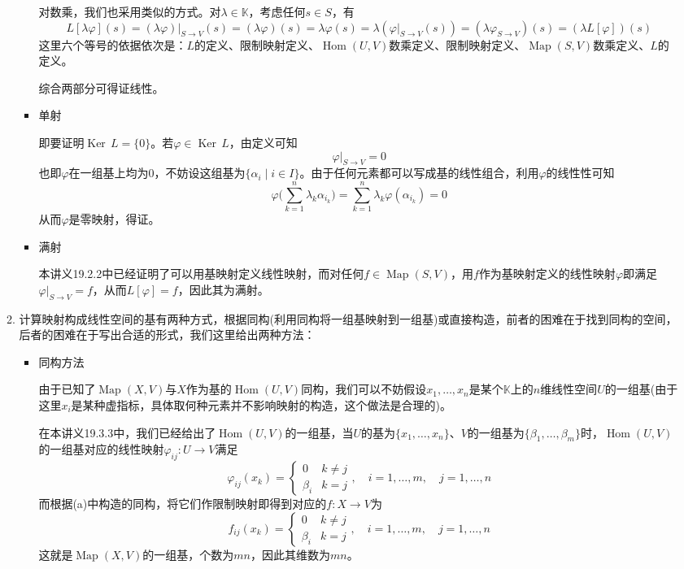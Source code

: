 \documentclass[a4paper,UTF8,fontset=windows,AutoFakeBold]{ctexart}
\DeclareMathOperator{\Ker}{Ker\,}
\DeclareMathOperator{\Hom}{Hom}
\DeclareMathOperator{\Map}{Map}
\begin{document}
\begin{enumerate}
\begin{enumerate}
\begin{itemize}
            对数乘，我们也采用类似的方式。对$\lambda\in\mathbb{K}$，考虑任何$s\in S$，有
            $$L[\lambda\varphi](s)=(\lambda\varphi)|_{S\to V}(s)=(\lambda\varphi)(s)=\lambda\varphi(s)=\lambda(\varphi|_{S\to V}(s))=(\lambda\varphi_{S\to V})(s)=(\lambda L[\varphi])(s)$$
            这里六个等号的依据依次是：$L$的定义、限制映射定义、$\Hom(U,V)$数乘定义、限制映射定义、$\Map(S,V)$数乘定义、$L$的定义。

            综合两部分可得证线性。
            
            \item 单射
            
            即要证明$\Ker L=\{0\}$。若$\varphi\in\Ker L$，由定义可知
            $$\varphi|_{S\to V}=0$$
            也即$\varphi$在一组基上均为0，不妨设这组基为$\{\alpha_i\mid i\in I\}$。由于任何元素都可以写成基的线性组合，利用$\varphi$的线性性可知
            $$\varphi\bigg(\sum_{k=1}^n\lambda_k\alpha_{i_k}\bigg)=\sum_{k=1}^n\lambda_k\varphi(\alpha_{i_k})=0$$
            从而$\varphi$是零映射，得证。

            \item 满射
            
            本讲义19.2.2中已经证明了可以用基映射定义线性映射，而对任何$f\in\Map(S,V)$，用$f$作为基映射定义的线性映射$\varphi$即满足$\varphi|_{S\to V}=f$，从而$L[\varphi]=f$，因此其为满射。
        \end{itemize}

        \item 计算映射构成线性空间的基有两种方式，根据同构(利用同构将一组基映射到一组基)或直接构造，前者的困难在于找到同构的空间，后者的困难在于写出合适的形式，我们这里给出两种方法：
        \begin{itemize}
            \item 同构方法
            
            由于已知了$\Map(X,V)$与$X$作为基的$\Hom(U,V)$同构，我们可以不妨假设$x_1,\dots,x_n$是某个$\mathbb{K}$上的$n$维线性空间$U$的一组基(由于这里$x_i$是某种虚指标，具体取何种元素并不影响映射的构造，这个做法是合理的)。

            在本讲义19.3.3中，我们已经给出了$\Hom(U,V)$的一组基，当$U$的基为$\{x_1,\dots,x_n\}$、$V$的一组基为$\{\beta_1,\dots,\beta_m\}$时，$\Hom(U,V)$的一组基对应的线性映射$\varphi_{ij}:U\to V$满足
            $$\varphi_{ij}(x_k)=\begin{cases}0&k\ne j\\\beta_i&k=j\end{cases},\quad i=1,\dots,m,\quad j=1,\dots,n$$
            而根据(a)中构造的同构，将它们作限制映射即得到对应的$f:X\to V$为
            $$f_{ij}(x_k)=\begin{cases}0&k\ne j\\\beta_i&k=j\end{cases},\quad i=1,\dots,m,\quad j=1,\dots,n$$
            这就是$\Map(X,V)$的一组基，个数为$mn$，因此其维数为$mn$。


\end{itemize}
\end{enumerate}
\end{enumerate}
\end{document}

